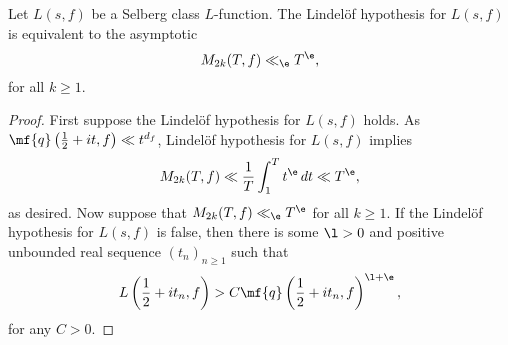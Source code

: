     \begin{proposition}
      Let $L(s,f)$ be a Selberg class $L$-function. The Lindel\"of hypothesis for $L(s,f)$ is equivalent to the asymptotic
      \[
        M_{2k}(T,f) \ll_{\e} T^{\e},
      \]
      for all $k \ge 1$.
    \end{proposition}
    \begin{proof}
      First suppose the Lindel\"of hypothesis for $L(s,f)$ holds. As $\mf{q}\left(\frac{1}{2}+it,f\right) \ll t^{d_{f}}$, Lindel\"of hypothesis for $L(s,f)$ implies
      \[
        M_{2k}(T,f) \ll \frac{1}{T}\int_{1}^{T}t^{\e}\,dt \ll T^{\e},
      \]
      as desired. Now suppose that $M_{2k}(T,f) \ll_{\e} T^{\e}$ for all $k \ge 1$. If the Lindel\"of hypothesis for $L(s,f)$ is false, then there is some $\l > 0$ and positive unbounded real sequence $(t_{n})_{n \ge 1}$ such that
      \[
        L\left(\frac{1}{2}+it_{n},f\right) > C\mf{q}\left(\frac{1}{2}+it_{n},f\right)^{\l+\e},
      \]
      for any $C > 0$. 
      \end{proof}
  \section{}